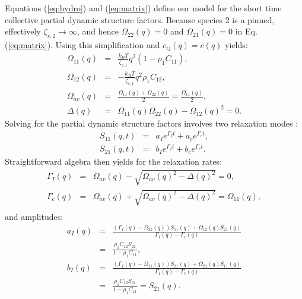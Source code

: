 \documentclass[twocolumn,showpacs,preprintnumbers,amsmath,amssymb,unsortedaddress,
]{revtex4-1}
\begin{document}
Equations (\ref{eq:hydro}) and (\ref{eq:matrix}) define our model for the short time collective partial dynamic structure factors. Because species 2 is a pinned, effectively $\zeta_{s,2} \rightarrow \infty$, and hence $\Omega_{22}(q) = 0$ and $\Omega_{21}(q) = 0$ in Eq.(\ref{eq:matrix}). Using this simplification and $c_{ij}(q)=c(q)$ yields:
\begin{eqnarray}
\Omega_{11}(q) &=& \frac{k_BT}{\zeta_{s,1}}q^2(1-\rho_1C_{11}), \nonumber\\
\Omega_{12}(q) &=& -\frac{k_BT}{\zeta_{s,1}}q^2\rho_1C_{12}, \nonumber\\
\Omega_{av}(q) &=& \frac{\Omega_{11}(q) + \Omega_{22}(q)}{2} = \frac{\Omega_{11}(q)}{2},\nonumber\\ 
\Delta(q) &=& \Omega_{11}(q)\Omega_{22}(q)-\Omega_{12}(q)^2 = 0.
\end{eqnarray}
Solving for the partial dynamic structure factors involves two relaxation modes \cite{34}:
\begin{eqnarray}
S_{11}(q,t) &=& a_Ie^{\Gamma_It}+a_ce^{\Gamma_ct},\nonumber\\ %
S_{21}(q,t) &=& b_Ie^{\Gamma_It}+b_ce^{\Gamma_ct}.%
\label{eq:S112}
\end{eqnarray}
Straightforward algebra then yields for the relaxation rates:
\begin{eqnarray}
\Gamma_{I}(q) &=& \Omega_{av}(q)- \sqrt{\Omega_{av}(q)^2-\Delta(q)^2} = 0,\nonumber\\
\Gamma_{c}(q) &=& \Omega_{av}(q)+ \sqrt{\Omega_{av}(q)^2-\Delta(q)^2} = \Omega_{11}(q),\nonumber\\
\end{eqnarray}
and amplitudes:
\begin{eqnarray}
a_I(q) &=& \frac{(\Gamma_I(q)-\Omega_{22}(q))S_{11}(q) + \Omega_{12}(q)S_{21}(q)}{\Gamma_I(q)-\Gamma_c(q)}\nonumber\\ &=& \frac{\rho_1C_{12}S_{21}}{1-\rho_1C_{11}},\nonumber\\
b_I(q) &=& \frac{(\Gamma_I(q)-\Omega_{11}(q))S_{21}(q) + \Omega_{21}(q)S_{11}(q)}{\Gamma_I(q)-\Gamma_c(q)}\nonumber\\ &=& \frac{\rho_1C_{12}S_{21}}{1-\rho_1C_{11}} = S_{21}(q).
\end{eqnarray}
\end{document}
